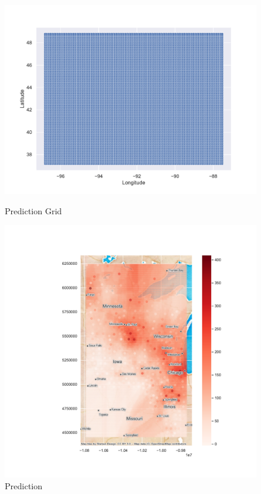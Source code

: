 \documentclass{article}
\begin{document}
\begin{figure}[htbp]
    \centering
    \begin{minipage}{0.62\textwidth}
        \includegraphics[width=\textwidth]{fig/Grid.pdf}
        \caption{Prediction Grid}
        \label{Prediction Grid}
    \end{minipage}\hfill
    \begin{minipage}{0.38\textwidth}
        \includegraphics[width=\textwidth]{fig/Prediction.pdf}
        \caption{Prediction}
        \label{Prediction}
    \end{minipage}
\end{figure}
\end{document}
